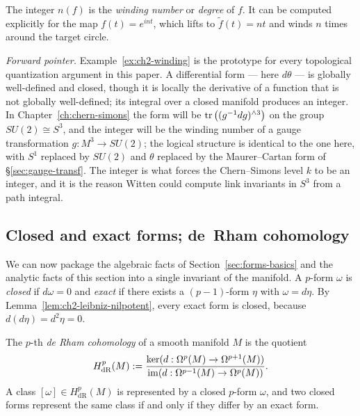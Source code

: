 \begin{example}
\medskip

\noindent The integer $n(f)$ is the \emph{winding number} or \emph{degree} of $f$. It can be computed explicitly for the map $f(t) = e^{int}$, which lifts to $\tilde f(t) = nt$ and winds $n$ times around the target circle.

\medskip

\noindent \emph{Forward pointer.} Example~\ref{ex:ch2-winding} is the prototype for every topological quantization argument in this paper. A differential form --- here $d\theta$ --- is globally well-defined and closed, though it is locally the derivative of a function that is not globally well-defined; its integral over a closed manifold produces an integer. In Chapter~\ref{ch:chern-simons} the form will be $\operatorname{tr}\left((g^{-1}dg)^{\wedge 3}\right)$ on the group $SU(2) \cong S^3$, and the integer will be the winding number of a gauge transformation $g : M^3 \to SU(2)$; the logical structure is identical to the one here, with $S^1$ replaced by $SU(2)$ and $\theta$ replaced by the Maurer--Cartan form of \S\ref{sec:gauge-transf}. The integer is what forces the Chern--Simons level $k$ to be an integer, and it is the reason Witten could compute link invariants in $S^3$ from a path integral.
\end{example}

\subsection{Closed and exact forms; de~Rham cohomology}\label{sec:deRham}

We can now package the algebraic facts of Section~\ref{sec:forms-basics} and the analytic facts of this section into a single invariant of the manifold. A $p$-form $\omega$ is \emph{closed} if $d\omega = 0$ and \emph{exact} if there exists a $(p-1)$-form $\eta$ with $\omega = d\eta$. By Lemma~\ref{lem:ch2-leibniz-nilpotent}, every exact form is closed, because $d(d\eta) = d^2\eta = 0$.

\begin{definition}\label{def:deRham}
The $p$-th \emph{de Rham cohomology} of a smooth manifold $M$ is the quotient
\begin{equation}\label{eq:deRham-def}
H^p_{\mathrm{dR}}(M) := \frac{\operatorname{ker}(d : \Omega^p(M) \to \Omega^{p+1}(M))}{\operatorname{im}(d : \Omega^{p-1}(M) \to \Omega^p(M))}.
\end{equation}
A class $[\omega] \in H^p_{\mathrm{dR}}(M)$ is represented by a closed $p$-form $\omega$, and two closed forms represent the same class if and only if they differ by an exact form.
\end{definition}

